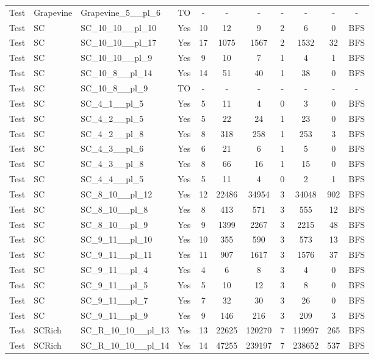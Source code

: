 \documentclass{article}
\begin{document}
\begin{tabular}{lllcccccccc}
Test & Grapevine & Grapevine\_5\_\_pl\_6 & TO & - & - & - & - & - & - & - \\
Test & SC & SC\_10\_10\_\_pl\_10 & Yes & 10 & 12 & 9 & 2 & 6 & 0 & BFS \\
Test & SC & SC\_10\_10\_\_pl\_17 & Yes & 17 & 1075 & 1567 & 2 & 1532 & 32 & BFS \\
Test & SC & SC\_10\_10\_\_pl\_9 & Yes & 9 & 10 & 7 & 1 & 4 & 1 & BFS \\
Test & SC & SC\_10\_8\_\_pl\_14 & Yes & 14 & 51 & 40 & 1 & 38 & 0 & BFS \\
Test & SC & SC\_10\_8\_\_pl\_9 & TO & - & - & - & - & - & - & - \\
Test & SC & SC\_4\_1\_\_pl\_5 & Yes & 5 & 11 & 4 & 0 & 3 & 0 & BFS \\
Test & SC & SC\_4\_2\_\_pl\_5 & Yes & 5 & 22 & 24 & 1 & 23 & 0 & BFS \\
Test & SC & SC\_4\_2\_\_pl\_8 & Yes & 8 & 318 & 258 & 1 & 253 & 3 & BFS \\
Test & SC & SC\_4\_3\_\_pl\_6 & Yes & 6 & 21 & 6 & 1 & 5 & 0 & BFS \\
Test & SC & SC\_4\_3\_\_pl\_8 & Yes & 8 & 66 & 16 & 1 & 15 & 0 & BFS \\
Test & SC & SC\_4\_4\_\_pl\_5 & Yes & 5 & 11 & 4 & 0 & 2 & 1 & BFS \\
Test & SC & SC\_8\_10\_\_pl\_12 & Yes & 12 & 22486 & 34954 & 3 & 34048 & 902 & BFS \\
Test & SC & SC\_8\_10\_\_pl\_8 & Yes & 8 & 413 & 571 & 3 & 555 & 12 & BFS \\
Test & SC & SC\_8\_10\_\_pl\_9 & Yes & 9 & 1399 & 2267 & 3 & 2215 & 48 & BFS \\
Test & SC & SC\_9\_11\_\_pl\_10 & Yes & 10 & 355 & 590 & 3 & 573 & 13 & BFS \\
Test & SC & SC\_9\_11\_\_pl\_11 & Yes & 11 & 907 & 1617 & 3 & 1576 & 37 & BFS \\
Test & SC & SC\_9\_11\_\_pl\_4 & Yes & 4 & 6 & 8 & 3 & 4 & 0 & BFS \\
Test & SC & SC\_9\_11\_\_pl\_5 & Yes & 5 & 10 & 12 & 3 & 8 & 0 & BFS \\
Test & SC & SC\_9\_11\_\_pl\_7 & Yes & 7 & 32 & 30 & 3 & 26 & 0 & BFS \\
Test & SC & SC\_9\_11\_\_pl\_9 & Yes & 9 & 146 & 216 & 3 & 209 & 3 & BFS \\
Test & SCRich & SC\_R\_10\_10\_\_pl\_13 & Yes & 13 & 22625 & 120270 & 7 & 119997 & 265 & BFS \\
Test & SCRich & SC\_R\_10\_10\_\_pl\_14 & Yes & 14 & 47255 & 239197 & 7 & 238652 & 537 & BFS \\

\end{tabular}
\end{document}
